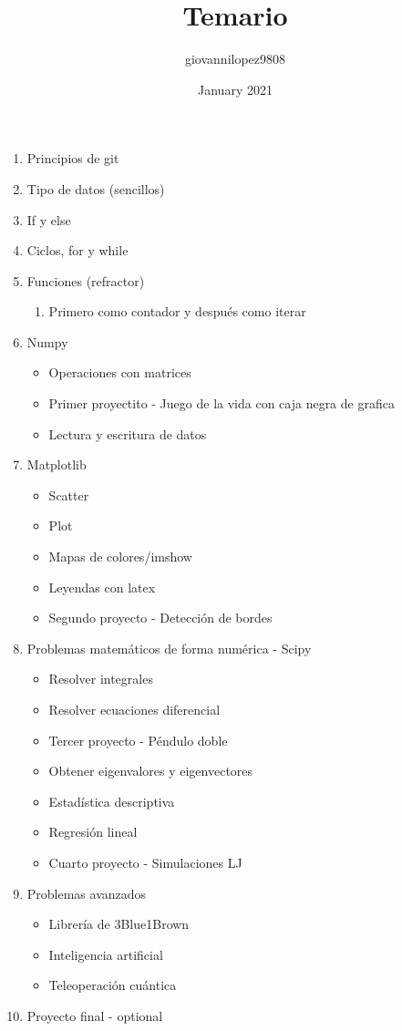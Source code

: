 \documentclass{article}
\title{Temario}
\author{giovannilopez9808 }
\date{January 2021}
\begin{document}
\begin{enumerate}
    \item Principios de git 
    \item Tipo de datos (sencillos)
    \item If y else
    \item Ciclos, for y while
    \item Funciones (refractor)
    \begin{enumerate}
        \item Primero como contador y después como iterar
    \end{enumerate}
    \item Numpy
    \begin{itemize}
        \item Operaciones con matrices
        \item Primer proyectito - Juego de la vida con caja negra de grafica
        \item Lectura y escritura de datos
    \end{itemize}
    \item Matplotlib
    \begin{itemize}
        \item Scatter
        \item Plot
        \item Mapas de colores/imshow
        \item Leyendas con latex
        \item Segundo proyecto - Detección de bordes 
    \end{itemize}
    \item Problemas matemáticos de forma numérica - Scipy
    \begin{itemize}
        \item Resolver integrales
        \item Resolver ecuaciones diferencial
        \item Tercer proyecto - Péndulo doble
        \item Obtener eigenvalores y eigenvectores
        \item Estadística descriptiva
        \item Regresión lineal
        \item Cuarto proyecto - Simulaciones LJ
    \end{itemize}
    \item Problemas avanzados
    \begin{itemize}
        \item Librería de 3Blue1Brown
        \item Inteligencia artificial
        \item Teleoperación cuántica
    \end{itemize}
    \item Proyecto final - optional
\end{enumerate}
\end{document}
